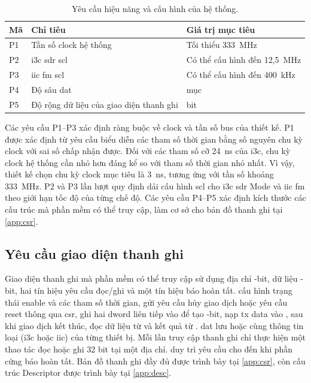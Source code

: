 \begin{table}[!htbp]
	\centering
	\caption{Yêu cầu hiệu năng và cấu hình của hệ thống.}
	\label{tab:req-perf}
	\begin{tabular}{C{1.4cm} L{6.8cm} L{5.0cm}}
		\toprule
		\textbf{Mã} & \textbf{Chỉ tiêu}                       & \textbf{Giá trị mục tiêu}    \\
		\midrule
		P1          & Tần số clock hệ thống                   & Tối thiểu 333~MHz            \\
		P2          & \gls{i3c} \gls{sdr} \gls{scl}           & Có thể cấu hình đến 12,5~MHz \\
		P3          & \gls{iic} \gls{fm} \gls{scl}            & Có thể cấu hình đến 400~kHz  \\
		P4          & Độ sâu \gls{dat}                        & \DatEntryCount{} mục         \\
		P5          & Độ rộng dữ liệu của giao diện thanh ghi & \RegisterDataWidth{} bit     \\
		\bottomrule
	\end{tabular}
\end{table}

Các yêu cầu P1--P3 xác định ràng buộc về clock và tần số bus của thiết kế. P1 được xác định từ yêu cầu biểu diễn các tham số thời gian bằng số nguyên chu kỳ clock với sai số chấp nhận được. Đối với các tham số cỡ 24~ns của \gls{i3c}, chu kỳ clock hệ thống cần nhỏ hơn đáng kể so với tham số thời gian nhỏ nhất. Vì vậy, thiết kế chọn chu kỳ clock mục tiêu là 3~ns, tương ứng với tần số khoảng 333~MHz. P2 và P3 lần lượt quy định dải cấu hình \gls{scl} cho \gls{i3c} \gls{sdr} Mode và \gls{iic} \gls{fm} theo giới hạn tốc độ của từng chế độ. Các yêu cầu P4--P5 xác định kích thước các cấu trúc mà phần mềm có thể truy cập, làm cơ sở cho bản đồ thanh ghi tại \cref{app:csr}.

\subsection{Yêu cầu giao diện thanh ghi}
\label{sec:req-sw}

Giao diện thanh ghi mà phần mềm có thể truy cập sử dụng địa chỉ \RegisterAddressWidth{}-bit, dữ liệu \RegisterDataWidth{}-bit, hai tín hiệu yêu cầu đọc/ghi và một tín hiệu báo hoàn tất. \Host{} cấu hình trạng thái enable và các tham số thời gian, gửi yêu cầu hủy giao dịch hoặc yêu cầu reset thông qua \gls{csr}, ghi hai \gls{dword} liên tiếp vào \CommandFifo{} để tạo \CommandDescriptor{} \CommandDescriptorWidth{}-bit, nạp \gls{tx} data vào \TxFifo{}, sau khi giao dịch kết thúc, đọc dữ liệu từ \RxFifo{} và kết quả từ \ResponseFifo{}. \gls{dat} lưu \StaticAddress{} hoặc \DynamicAddress{} cùng thông tin loại \Target{} (\gls{i3c} hoặc \gls{iic}) của từng thiết bị. Mỗi lần truy cập thanh ghi chỉ thực hiện một thao tác đọc hoặc ghi 32 bit tại một địa chỉ. \Host{} duy trì yêu cầu cho đến khi phần cứng báo hoàn tất. Bản đồ thanh ghi đầy đủ được trình bày tại \cref{app:csr}, còn cấu trúc Descriptor được trình bày tại \cref{app:desc}.

